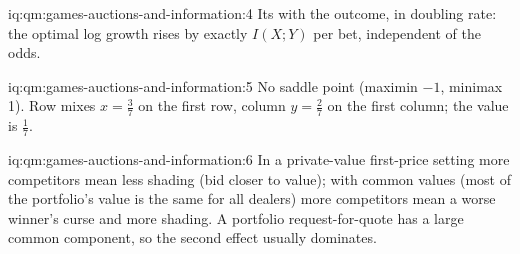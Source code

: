 \begin{solution}{iq:qm:games-auctions-and-information:4}
Its  with the outcome, in doubling rate: the optimal log growth rises by exactly $I(X; Y)$ per bet, independent of the odds.
\end{solution}

\begin{solution}{iq:qm:games-auctions-and-information:5}
No saddle point (maximin $-1$, minimax 1). Row mixes $x = \frac37$ on the first row, column $y = \frac27$ on the first column; the value is $\frac17$.
\end{solution}

\begin{solution}{iq:qm:games-auctions-and-information:6}
In a private-value first-price setting more competitors mean less shading (bid closer to value); with common values (most of the portfolio's value is the same for all dealers) more competitors mean a worse winner's
curse and more shading. A portfolio request-for-quote has a large common component, so the second effect usually dominates.
\end{solution}
